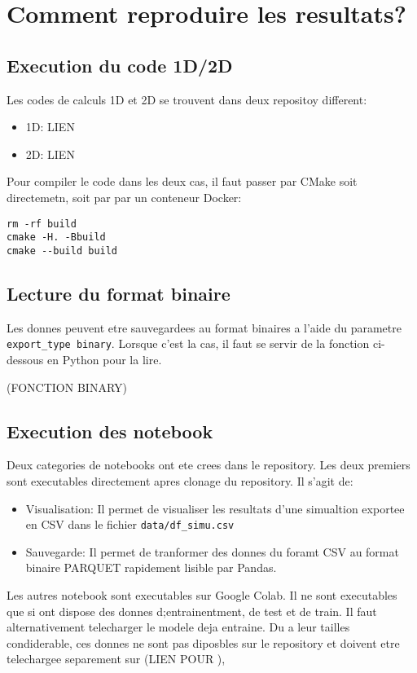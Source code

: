 

\chapter{Comment reproduire les resultats?} %

\label{AppendixA} %

\section{Execution du code 1D/2D}

Les codes de calculs 1D et 2D se trouvent dans deux repositoy different:
\begin{itemize}
 \item 1D: LIEN
 \item 2D: LIEN
\end{itemize}


Pour compiler le code dans les deux cas, il faut passer par CMake soit directemetn, soit par par un conteneur Docker:
\begin{verbatim}
rm -rf build
cmake -H. -Bbuild
cmake --build build
\end{verbatim}

\section{Lecture du format binaire}
Les donnes peuvent etre sauvegardees au format binaires a l'aide du parametre \verb|export_type binary|. Lorsque c'est la cas, il faut se servir de la fonction ci-dessous en Python pour la lire.

(FONCTION BINARY)

\section{Execution des notebook}
Deux categories de notebooks ont ete crees dans le repository. Les deux premiers sont executables directement apres clonage du repository. Il s'agit de:
\begin{itemize}
 \item Visualisation: Il permet de visualiser les resultats d'une simualtion exportee en CSV dans le fichier \verb|data/df_simu.csv|
 \item Sauvegarde: Il permet de tranformer des donnes du foramt CSV au format binaire PARQUET rapidement lisible par Pandas.
\end{itemize}

Les autres notebook sont executables sur Google Colab. Il ne sont executables que si ont dispose des donnes d;entrainentment, de test et de train. Il faut alternativement telecharger le modele deja entraine. Du a leur tailles condiderable, ces donnes ne sont pas diposbles sur le repository et doivent etre telechargee separement sur (LIEN POUR ), 
